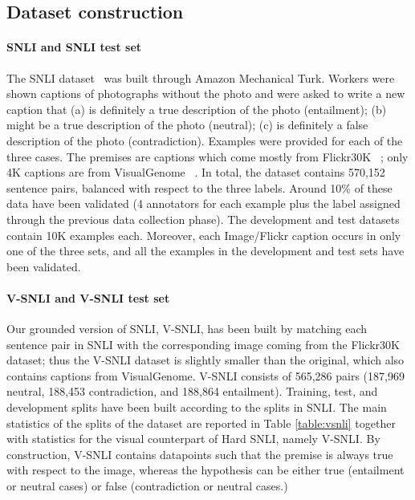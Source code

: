 \documentclass[11pt]{article}
\begin{document}
\subsection{Dataset construction}

\paragraph{SNLI and SNLI test set} The SNLI dataset~\cite{snli:emnlp2015} 
was
built through Amazon
Mechanical Turk. Workers were shown captions of photographs 
without the photo
and were asked to write a new caption that (a) is definitely  a true description of the photo (entailment); (b) might be
a true description of the photo (neutral); (c) is definitely a false
description of the photo (contradiction). Examples were provided
for each of the three cases.
The premises are captions which come mostly from
Flickr30K ~\cite{youn:from14}; only 4K captions are from
VisualGenome ~\cite{kris:visu17}. In total, the dataset contains
570,152 sentence pairs, balanced with respect to the three
labels. Around 10\% of these data have been validated (4 annotators
for each example plus the label assigned through the previous data
collection phase). The development and test datasets contain 10K
examples each. Moreover, each Image/Flickr caption occurs in only one of the three
sets, and all the examples in the development and test sets have been
validated.

\paragraph{V-SNLI and V-SNLI test set} Our grounded version of SNLI, V-SNLI,
has been built by matching each sentence pair in SNLI with the
corresponding image coming from the Flickr30K dataset; thus the V-SNLI
dataset is slightly smaller than the original, which also contains
captions from VisualGenome. V-SNLI consists of 565,286
pairs (187,969 neutral, 188,453 contradiction, and 188,864
entailment). Training, test, and development splits have been built
according to the splits in SNLI. The main statistics of
the splits of the dataset are reported in Table \ref{table:vsnli}
together with statistics for the visual counterpart of Hard SNLI, namely
V-SNLI. By construction, V-SNLI contains datapoints such that
the premise is always true with respect to the image, whereas the hypothesis
can be either true (entailment or neutral cases) or false
(contradiction or neutral cases.)
\end{document}
